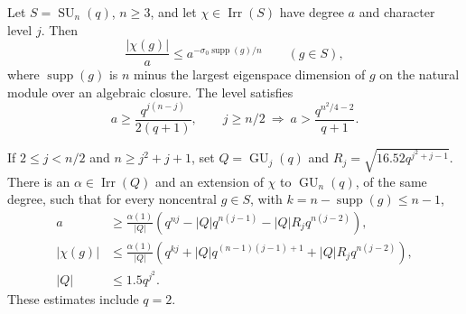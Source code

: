 \begin{lemma}
\label{D-UNW-01}
Let $S=\operatorname{SU}_n(q)$, $n\ge3$, and let
$\chi\in\operatorname{Irr}(S)$ have degree $a$ and character level
$j$.  Then
\[
 \frac{|\chi(g)|}{a}\le
 a^{-\sigma_0\operatorname{supp}(g)/n}\qquad(g\in S),
                                                               \tag{UNW.3}
\]
where $\operatorname{supp}(g)$ is $n$ minus the largest eigenspace
dimension of $g$ on the natural module over an algebraic closure.
The level satisfies
\[
 a\ge \frac{q^{j(n-j)}}{2(q+1)},\qquad
 j\ge n/2\ \Longrightarrow\
 a>\frac{q^{n^2/4-2}}{q+1}.                                  \tag{UNW.4}
\]

If $2\le j<n/2$ and $n\ge j^2+j+1$, set
$Q=\operatorname{GU}_j(q)$ and
$R_j=\sqrt{16.52q^{j^2+j-1}}$.
There is an $\alpha\in\operatorname{Irr}(Q)$ and an extension of
$\chi$ to $\operatorname{GU}_n(q)$, of the same degree, such that
for every noncentral $g\in S$, with
$k=n-\operatorname{supp}(g)\le n-1$,
\[
\begin{split}
 a&\ge\frac{\alpha(1)}{|Q|}
 \left(q^{nj}-|Q|q^{n(j-1)}-|Q|R_jq^{n(j-2)}\right),\\
 |\chi(g)|&\le\frac{\alpha(1)}{|Q|}
 \left(q^{kj}+|Q|q^{(n-1)(j-1)+1}
                  +|Q|R_jq^{n(j-2)}\right),\\
 |Q|&\le1.5q^{j^2}.
\end{split}                                                    \tag{UNW.5}
\]
These estimates include $q=2$.
\end{lemma}

